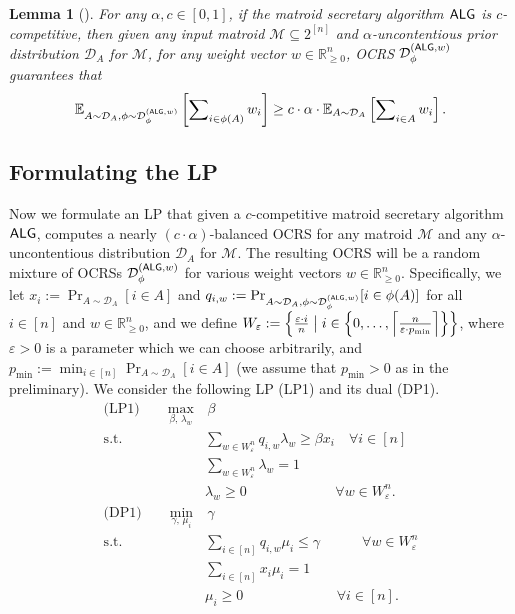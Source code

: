\documentclass[11pt]{article}
\newcommand{\ceil}[1]{\left\lceil #1 \right\rceil}
\newcommand{\D}{\mathcal D}
\def \E {\mathbb{E}}
\newcommand{\M}{{\mathcal M}}
\newcommand{\alg}{\textnormal{\sffamily ALG}}
\newcommand{\eps}{\varepsilon}
\newcommand{\R}{{\mathbb R}}
\newtheorem{lemma}[theorem]{Lemma}
\begin{document}
\begin{lemma}[{\citet[Lemma 4.3]{dughmi2020outer}}]\label{lem:D_phi_A_w}
For any $\alpha,c\in[0,1]$, if the matroid secretary algorithm $\alg$ is $c$-competitive, then given any input matroid $\M\subseteq2^{[n]}$ and $\alpha$-uncontentious prior distribution $\D_A$ for $\M$, for any weight vector $w\in\R_{\ge0}^n$, OCRS $\D_{\phi}^{(\alg,w)}$ guarantees that 
\[
\E_{A\sim\D_A,\phi\sim\D_{\phi}^{(\alg,w)}}\left[\sum\nolimits_{i\in\phi(A)} w_i\right]\ge c\cdot\alpha\cdot\E_{A\sim\D_A}\left[\sum\nolimits_{i\in A} w_i\right].
\]
\end{lemma}
\subsection{Formulating the LP}
Now we formulate an LP that given a $c$-competitive matroid secretary algorithm $\alg$, computes a nearly $(c\cdot\alpha)$-balanced OCRS for any matroid $\M$ and any $\alpha$-uncontentious distribution $\D_A$ for $\M$. The resulting OCRS will be a random mixture of OCRSs $\D_{\phi}^{(\alg,w)}$ for various weight vectors $w\in\R_{\ge0}^n$. Specifically, we let $x_i:=\Pr_{A\sim\D_A}[i\in A]$ and $q_{i,w}:=\Pr_{A\sim\D_A,\phi\sim\D_{\phi}^{(\alg,w)}}[i\in\phi(A)]$ for all $i\in[n]$ and $w\in\R_{\ge0}^{n}$, and we define $W_{\eps}:=\left\{\frac{\eps\cdot i}{n}\bigm\vert i\in\left\{0,\dots,\ceil{\frac{n}{\eps\cdot p_{\min}}}\right\}\right\}$, where $\eps>0$ is a parameter which we can choose arbitrarily, and $p_{\min}:=\min_{i\in[n]}\Pr_{A\sim\D_A}[i\in A]$ (we assume that $p_{\min}>0$ as in the preliminary). We consider the following LP (LP1) and its dual (DP1).
\begin{align}\label{eq:secretary_to_crs_lp_1}
    \textrm{(LP1)}\qquad\max_{\beta,\,\lambda_w}&\,\beta\nonumber\\
    \textrm{s.t. }& \sum_{w\in W_{\eps}^n} q_{i,w}\lambda_w\ge\beta x_i \quad\forall i\in [n]\nonumber\\
    & \sum_{w\in W_{\eps}^n}\lambda_w=1\nonumber\\
    & \lambda_w\ge 0 \qquad\qquad\qquad\,\,\forall w\in W_{\eps}^n.\nonumber\\
    \textrm{(DP1)}\qquad\min_{\gamma,\,\mu_i}&\,\gamma\nonumber\\
    \textrm{s.t. }& \sum_{i\in[n]} q_{i,w}\mu_i\le\gamma \qquad\,\,\,\,\,\,\forall w\in W_{\eps}^n\nonumber\\
    & \sum_{i\in[n]}x_i\mu_i=1\nonumber\\
    & \mu_i\ge 0 \qquad\qquad\qquad\,\,\,\,\forall i\in [n].
\end{align}
\end{document}
